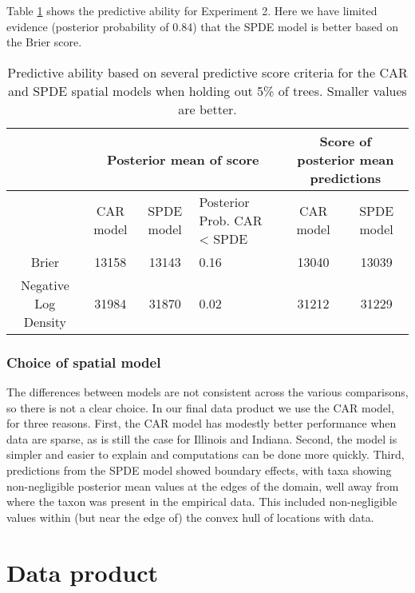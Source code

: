 \documentclass[12pt]{article}\usepackage[]{graphicx}\usepackage[]{color}
\providecommand{\tabularnewline}{\\}
\begin{document}
Table \ref{tab:score_tree} shows the predictive ability for Experiment
2. Here we have limited evidence (posterior probability of 0.84) that
the SPDE model is better based on the Brier score.



%
\begin{table}
\caption{Predictive ability based on several predictive score criteria for
the CAR and SPDE spatial models when holding out 5\% of trees. Smaller
values are better.}


\begin{tabular}{|c|c|c|>{\centering}p{3cm}|c|c|}
\hline 
 &
\multicolumn{3}{c|}{{\small{Posterior mean of score}}} &
\multicolumn{2}{c|}{{\small{Score of posterior mean predictions}}}\tabularnewline
\hline 
\hline 
 &
{\small{CAR model}} &
{\small{SPDE model}} &
{\small{Posterior Prob. CAR < SPDE}} &
{\small{CAR model}} &
{\small{SPDE model}}\tabularnewline
\hline 
{\small{Brier}} &
{\small{13158}} &
{\small{13143}} &
{\small{0.16}} &
{\small{13040}} &
{\small{13039}}\tabularnewline
\hline 
{\small{Negative Log Density}} &
{\small{31984}} &
{\small{31870}} &
{\small{0.02}} &
{\small{31212}} &
{\small{31229}}\tabularnewline
\hline 
\end{tabular}

\label{tab:score_tree}
\end{table}



\subsubsection{Choice of spatial model}

The differences between models are not consistent across the various
comparisons, so there is not a clear choice. In our final data product
we use the CAR model, for three reasons. First, the CAR model has
modestly better performance when data are sparse, as is still the
case for Illinois and Indiana. Second, the model is simpler and easier
to explain and computations can be done more quickly. Third, predictions
from the SPDE model showed boundary effects, with taxa showing non-negligible
posterior mean values at the edges of the domain, well away from where
the taxon was present in the empirical data. This included non-negligible
values within (but near the edge of) the convex hull of locations
with data. 


\section{Data product}
\end{document}
